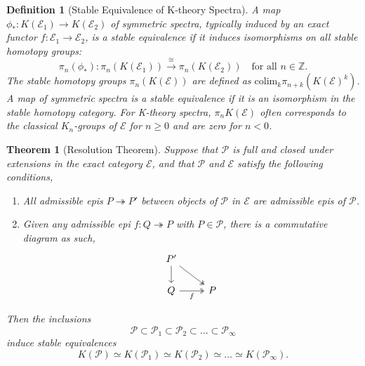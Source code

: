 \documentclass[12pt]{report}
\numberwithin{equation}{section}
\newtheorem{theorem}[dummy]{Theorem}
\newtheorem{definition}[dummy]{Definition}
\begin{document}
	\begin{definition}[Stable Equivalence of K-theory Spectra]
		A map $\phi_*: K(\mathcal{E}_1) \to K(\mathcal{E}_2)$ of symmetric spectra, typically induced by an exact functor $f: \mathcal{E}_1 \to \mathcal{E}_2$, is a {stable equivalence} if it induces isomorphisms on all stable homotopy groups:
		\[ \pi_n(\phi_*): \pi_n(K(\mathcal{E}_1)) \xrightarrow{\cong} \pi_n(K(\mathcal{E}_2)) \quad \text{for all } n \in \mathbb{Z}. \]
		The stable homotopy groups $\pi_n(K(\mathcal{E}))$ are defined as $\mathrm{colim}_k \pi_{n+k}(K(\mathcal{E})^k)$. A map of symmetric spectra is a stable equivalence if it is an isomorphism in the stable homotopy category. For K-theory spectra, $\pi_n K(\mathcal{E})$ often corresponds to the classical $K_n$-groups of $\mathcal{E}$ for $n \ge 0$ and are zero for $n < 0$.
	\end{definition}
	
	\begin{theorem}[Resolution Theorem]
		Suppose that $\mathcal{P}$ is full and closed under extensions in the exact category $\mathcal{E}$, and that $\mathcal{P}$ and $\mathcal{E}$ satisfy the following conditions,
		\begin{enumerate}
			\item All admissible epis \( P \twoheadrightarrow P' \) between objects of \( \mathcal{P} \) in \( \mathcal{E} \) are admissible epis of \( \mathcal{P} \).
			\item Given any admissible epi \( f:Q \twoheadrightarrow P \) with \( P \in \mathcal{P} \), there is a commutative diagram as such,
			\[\begin{tikzcd}
				{P'} \\
				Q & P
				\arrow[from=1-1, to=2-1]
				\arrow[two heads, from=1-1, to=2-2]
				\arrow["f"', two heads, from=2-1, to=2-2]
			\end{tikzcd}\]
		\end{enumerate} Then the inclusions
		\[ \mathcal{P} \subset \mathcal{P}_1 \subset \mathcal{P}_2 \subset \dots \subset \mathcal{P}_\infty \]
		induce stable equivalences
		\[ K(\mathcal{P}) \simeq K(\mathcal{P}_1) \simeq K(\mathcal{P}_2) \simeq \dots \simeq K(\mathcal{P}_\infty). \]
	\end{theorem}
	
\end{document}
